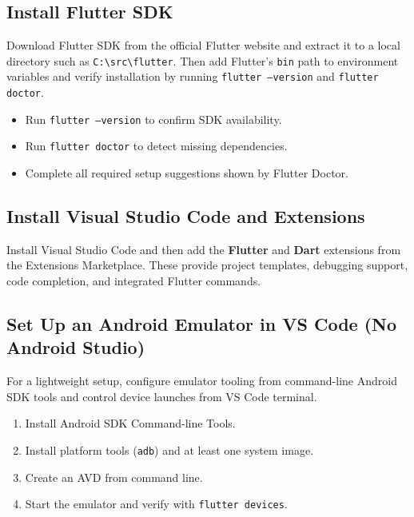 \documentclass{article}
\begin{document}
\subsection{Install Flutter SDK}
Download Flutter SDK from the official Flutter website and extract it to a local directory such as \texttt{C:\textbackslash src\textbackslash flutter}. Then add Flutter's \texttt{bin} path to environment variables and verify installation by running \texttt{flutter --version} and \texttt{flutter doctor}.

\begin{reportbox}
\begin{itemize}
\item Run \texttt{flutter --version} to confirm SDK availability.
\item Run \texttt{flutter doctor} to detect missing dependencies.
\item Complete all required setup suggestions shown by Flutter Doctor.
\end{itemize}
\end{reportbox}

\subsection{Install Visual Studio Code and Extensions}
Install Visual Studio Code and then add the \textbf{Flutter} and \textbf{Dart} extensions from the Extensions Marketplace. These provide project templates, debugging support, code completion, and integrated Flutter commands.

\subsection{Set Up an Android Emulator in VS Code (No Android Studio)}
For a lightweight setup, configure emulator tooling from command-line Android SDK tools and control device launches from VS Code terminal.

\begin{featurebox}
\begin{enumerate}
\item Install Android SDK Command-line Tools.
\item Install platform tools (\texttt{adb}) and at least one system image.
\item Create an AVD from command line.
\item Start the emulator and verify with \texttt{flutter devices}.
\end{enumerate}
\end{featurebox}
\end{document}
